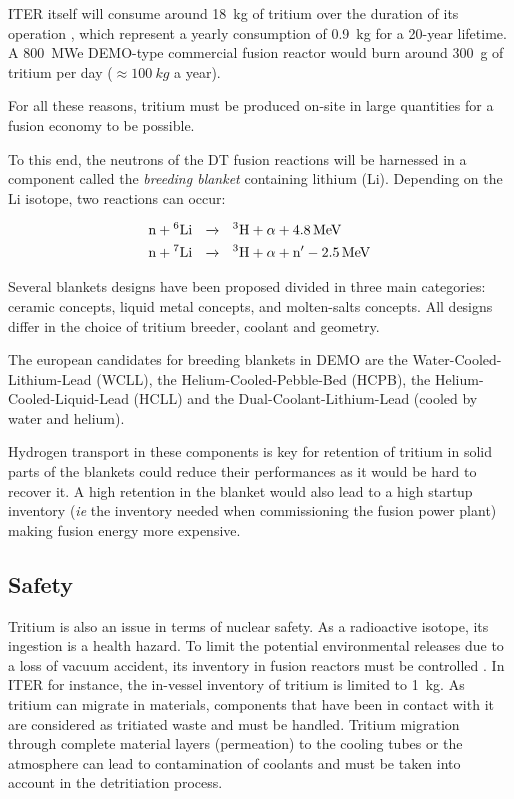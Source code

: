 ITER itself will consume around \SI{18}{kg} of tritium over the duration of its operation , which represent a yearly consumption of \SI{0.9}{kg} for a 20-year lifetime.
A \SI{800}{MWe} DEMO-type commercial fusion reactor would burn around \SI{300}{g} of tritium per day ($\approx \SI{100}{kg}$ a year).

For all these reasons, tritium must be produced on-site in large quantities for a fusion economy to be possible.

To this end, the neutrons of the DT fusion reactions will be harnessed in a component called the \textit{breeding blanket} containing lithium (Li).
Depending on the Li isotope, two reactions can occur:

\begin{align}
    \text{n} + \text{\textsuperscript{6}Li}  \ \ &\xrightarrow{} \ \ \text{\textsuperscript{3}H} + \alpha + \SI{4.8}{MeV}\\
    \text{n} + \text{\textsuperscript{7}Li}  \ \ &\xrightarrow{} \ \ \text{\textsuperscript{3}H} + \alpha + \text{n}' - \SI{2.5}{MeV} 
\end{align}

Several blankets designs have been proposed divided in three main categories: ceramic concepts, liquid metal concepts, and molten-salts concepts.
All designs differ in the choice of tritium breeder, coolant and geometry.

The european candidates for breeding blankets in DEMO are the Water-Cooled-Lithium-Lead (WCLL), the Helium-Cooled-Pebble-Bed (HCPB), the Helium-Cooled-Liquid-Lead (HCLL) and the Dual-Coolant-Lithium-Lead (cooled by water and helium).

Hydrogen transport in these components is key for retention of tritium in solid parts of the blankets could reduce their performances as it would be hard to recover it.
A high retention in the blanket would also lead to a high startup inventory (\textit{ie} the inventory needed when commissioning the fusion power plant) making fusion energy more expensive.

\subsection{Safety}
Tritium is also an issue in terms of nuclear safety.
As a radioactive isotope, its ingestion is a health hazard.
To limit the potential environmental releases due to a loss of vacuum accident, its inventory in fusion reactors must be controlled .
In ITER for instance, the in-vessel inventory of tritium is limited to \SI{1}{kg}.
As tritium can migrate in materials, components that have been in contact with it are considered as tritiated waste and must be handled.
Tritium migration through complete material layers (permeation) to the cooling tubes or the atmosphere can lead to contamination of coolants and must be taken into account in the detritiation process.

